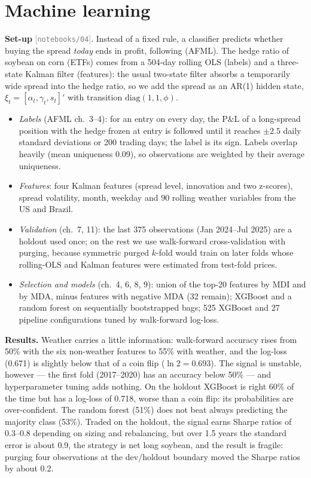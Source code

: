 \documentclass[11pt,a4paper]{article}
\newcommand{\nb}[1]{\textcolor{gray}{\small[\texttt{notebooks/#1}]}}
\begin{document}
\section{Machine learning}\label{sec:ml}
\textbf{Set-up} \nb{04}. Instead of a fixed rule, a classifier predicts whether buying the spread \emph{today} ends
in profit, following \citet{lopezdeprado2018} (AFML). The hedge ratio of soybean on corn (ETFs) comes from a 504-day rolling OLS
(labels) and a three-state Kalman filter (features): the usual two-state filter absorbs a temporarily wide spread into
the hedge ratio, so we add the spread as an AR(1) hidden state, $\xi_t=[\alpha_t,\gamma_t,s_t]'$ with transition
$\mathrm{diag}(1,1,\phi)$.
\begin{itemize}
\item \emph{Labels} (AFML ch.~3--4): for an entry on every day, the P\&L of a long-spread position with the hedge
frozen at entry is followed until it reaches $\pm2.5$ daily standard deviations or 200 trading days; the label is its
sign. Labels overlap heavily (mean uniqueness 0.09), so observations are weighted by their average uniqueness.
\item \emph{Features}: four Kalman features (spread level, innovation and two z-scores), spread volatility, month,
weekday and 90 rolling weather variables from the US and Brazil.
\item \emph{Validation} (ch.~7, 11): the last 375 observations (Jan 2024--Jul 2025) are a holdout used once; on the rest
we use walk-forward cross-validation with purging, because symmetric purged $k$-fold would train on later folds whose
rolling-OLS and Kalman features were estimated from test-fold prices.
\item \emph{Selection and models} (ch.~4, 6, 8, 9): union of the top-20 features by MDI and by MDA, minus features with
negative MDA (32 remain); XGBoost and a random forest on sequentially bootstrapped bags; 525 XGBoost and 27 pipeline
configurations tuned by walk-forward log-loss.
\end{itemize}

\textbf{Results.} Weather carries a little information: walk-forward accuracy rises from 50\% with the six non-weather
features to 55\% with weather, and the log-loss (0.671) is slightly below that of a coin flip ($\ln2=0.693$). The signal
is unstable, however --- the first fold (2017--2020) has an accuracy below 50\% --- and hyperparameter tuning adds
nothing. On the holdout XGBoost is right 60\% of the time but has a log-loss of 0.718, worse than a coin flip: its
probabilities are over-confident. The random forest (51\%) does not beat always predicting the majority class (53\%).
Traded on the holdout, the signal earns Sharpe ratios of 0.3--0.8 depending on sizing and rebalancing, but over 1.5
years the standard error is about 0.9, the strategy is net long soybean, and the result is fragile: purging four
observations at the dev/holdout boundary moved the Sharpe ratios by about 0.2.
\end{document}
